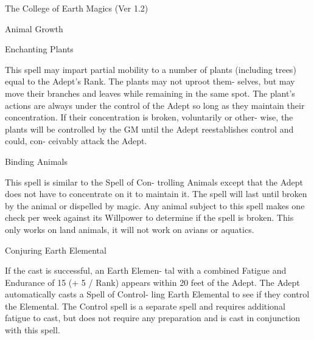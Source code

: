 \begin{Chapter}{The College of Earth Magics (Ver 1.2)}
\begin{spell}[S-7]{Animal Growth }
\begin{effects}
\end{effects}
\end{spell}

\begin{spell}[S-8]{Enchanting Plants }

\begin{effects}
This spell may impart partial mobility to a 
number  of  plants  (including  trees)  equal  to  the 
Adept’s  Rank.  The  plants  may  not  uproot  them-
selves,  but  may  move  their  branches  and  leaves 
while  remaining  in  the  same  spot.  The  plant’s 
actions  are  always  under  the  control  of  the  Adept 
so  long  as  they  maintain  their  concentration.  If 
their  concentration  is  broken,  voluntarily  or  other-
wise, the plants will be controlled by the GM until 
the  Adept  reestablishes  control  and  could,  con-
ceivably attack the Adept. 

\end{effects}
\end{spell}

\begin{spell}[S-9]{Binding Animals }

\begin{effects}
 This  spell  is  similar  to  the  Spell  of  Con-
trolling  Animals  except  that  the  Adept  does  not 
have  to  concentrate  on  it  to  maintain  it.  The  spell 
will last until broken by the animal or dispelled by 
magic. Any animal subject to this spell makes one 
check per week against its Willpower to determine 
if  the  spell  is  broken.  This  only  works  on  land 
animals, it will not work on avians or aquatics. 

\end{effects}
\end{spell}

\begin{spell}[S-10]{Conjuring Earth Elemental }

\begin{effects}
 If the cast is successful, an Earth Elemen-
tal  with  a  combined  Fatigue  and  Endurance  of  15 
(+  5  /  Rank)  appears  within  20  feet  of  the  Adept. 
The  Adept  automatically  casts  a  Spell  of  Control-
ling  Earth  Elemental  to  see  if  they  control  the 
Elemental. The Control spell is a separate spell and 
requires  additional  fatigue  to  cast,  but  does  not 
require  any  preparation  and  is  cast  in  conjunction 
with this spell. 


\end{effects}
\end{spell}
\end{Chapter}

